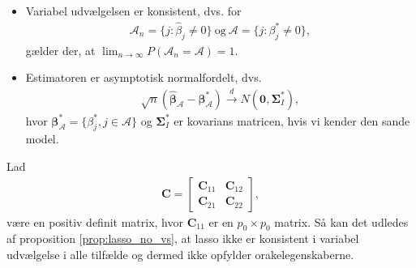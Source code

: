\begin{defn}[Orakelegenskaber]
\begin{itemize}
\item Variabel udvælgelsen er konsistent, dvs. for
\begin{align*}
\mathcal{A}_n=\lbrace j :\hat{\beta}_j \neq 0 \rbrace \ \text{og} \ \mathcal{A} =\{j:\beta_j^* \neq 0\},
\end{align*}
gælder der, at $\lim_{n \rightarrow \infty }P(\mathcal{A}_n=\mathcal{A})=1$.
\item Estimatoren er asymptotisk normalfordelt, dvs.
\begin{align*}
\sqrt{n}(\hat{\boldsymbol{\beta}}_\mathcal{A}-\boldsymbol{\beta}^*_\mathcal{A}) \overset{d}{\rightarrow} N(\mathbf{0}, \boldsymbol{\Sigma}^*_I),
\end{align*}
hvor $\boldsymbol{\beta}^*_\mathcal{A}=\{ \beta_j^*, j \in \mathcal{A} \}$ og $\boldsymbol{\Sigma}^*_I$ er kovarians matricen, hvis vi kender den sande model.
\end{itemize}
\end{defn}

%
Lad  
\begin{align*}
\textbf{C} = 
\begin{bmatrix}
\textbf{C}_{11}& \textbf{C}_{12}\\
\textbf{C}_{21}& \textbf{C}_{22}
\end{bmatrix},
\end{align*}
være en positiv definit matrix, hvor $\textbf{C}_{11}$ er en $p_0 \times p_0$ matrix. Så kan det udledes af proposition \ref{prop:lasso_no_vs}, at lasso ikke er konsistent i variabel udvælgelse i alle tilfælde og dermed ikke opfylder orakelegenskaberne.

